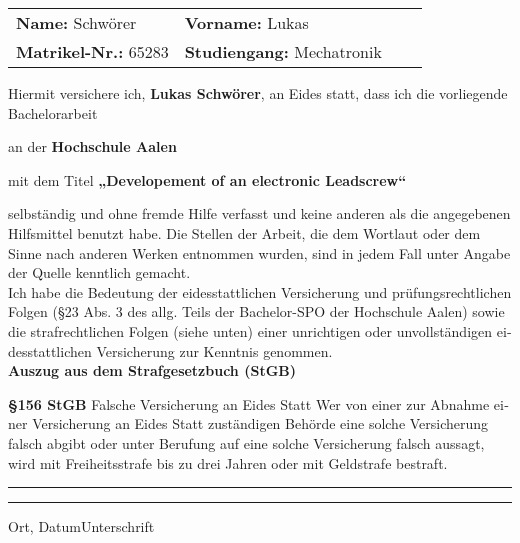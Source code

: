 \begin{otherlanguage}{ngerman}

\vspace*{5mm}

\thispagestyle{empty}

\begin{flushleft}
\begin{tabular}[h]{p{60mm}l p{60mm}l}
\textbf{Name:} Schwörer 			&\textbf{Vorname:} Lukas\\
\textbf{Matrikel-Nr.:} 65283		&\textbf{Studiengang:} Mechatronik\\
\end{tabular}
\end{flushleft}

\vspace*{11mm}

Hiermit versichere ich, \textbf{Lukas Schwörer}, an Eides statt, dass ich die vorliegende Bachelorarbeit

an der \textbf{Hochschule Aalen}

mit dem Titel \textbf{„Developement of an electronic Leadscrew“}

selbständig und ohne fremde Hilfe verfasst und keine anderen als die angegebenen Hilfsmittel benutzt habe. Die Stellen der Arbeit, die dem Wortlaut oder dem Sinne nach anderen Werken entnommen wurden, sind in jedem Fall unter Angabe der Quelle kenntlich gemacht.\\

Ich habe die Bedeutung der eidesstattlichen Versicherung und prüfungsrechtlichen Folgen (\S 23 Abs. 3 des allg. Teils der Bachelor-SPO der Hochschule Aalen) sowie die strafrechtlichen Folgen (siehe unten) einer unrichtigen oder unvollständigen eidesstattlichen Versicherung zur Kenntnis genommen.\\

\vspace*{10mm}
\Large\textbf{Auszug aus dem Strafgesetzbuch (StGB)}


\normalsize\textbf{\S 156 StGB} Falsche Versicherung an Eides Statt
Wer von einer zur Abnahme einer Versicherung an Eides Statt zuständigen Behörde eine solche Versicherung falsch abgibt oder unter Berufung auf eine solche Versicherung falsch aussagt, wird mit Freiheitsstrafe bis zu drei Jahren oder mit Geldstrafe bestraft.

\vspace*{25mm}


\rule[-0.2cm]{5cm}{0.5pt} \hspace*{30mm}\rule[-0.2cm]{5cm}{0.5pt}
\newline
Ort, Datum\hspace*{61.85mm}Unterschrift

\end{otherlanguage}